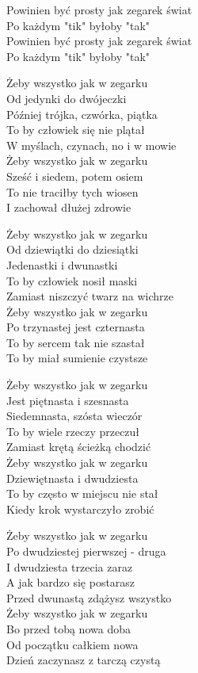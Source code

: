 \begin{text}
    Powinien być prosty jak zegarek świat\\
    Po każdym "tik" byłoby "tak"\\
    Powinien być prosty jak zegarek świat\\
    Po każdym "tik" byłoby "tak"

    Żeby wszystko jak w zegarku\\
    Od jedynki do dwójeczki\\
    Później trójka, czwórka, piątka\\
    To by człowiek się nie plątał\\
    W myślach, czynach, no i w mowie\\
    Żeby wszystko jak w zegarku\\
    Sześć i siedem, potem osiem\\
    To nie traciłby tych wiosen\\
    I zachował dłużej zdrowie

    Żeby wszystko jak w zegarku\\
    Od dziewiątki do dziesiątki\\
    Jedenastki i dwunastki\\
    To by człowiek nosił maski\\
    Zamiast niszczyć twarz na wichrze\\
    Żeby wszystko jak w zegarku\\
    Po trzynastej jest czternasta\\
    To by sercem tak nie szastał\\
    To by miał sumienie czystsze

    Żeby wszystko jak w zegarku\\
    Jest piętnasta i szesnasta\\
    Siedemnasta, szósta wieczór\\
    To by wiele rzeczy przeczuł\\
    Zamiast krętą ścieżką chodzić\\
    Żeby wszystko jak w zegarku\\
    Dziewiętnasta i dwudziesta\\
    To by często w miejscu nie stał\\
    Kiedy krok wystarczyło zrobić

    Żeby wszystko jak w zegarku\\
    Po dwudziestej pierwszej - druga\\
    I dwudziesta trzecia zaraz\\
    A jak bardzo się postarasz\\
    Przed dwunastą zdążysz wszystko\\
    Żeby wszystko jak w zegarku\\
    Bo przed tobą nowa doba\\
    Od początku całkiem nowa\\
    Dzień zaczynasz z tarczą czystą
\end{text}
